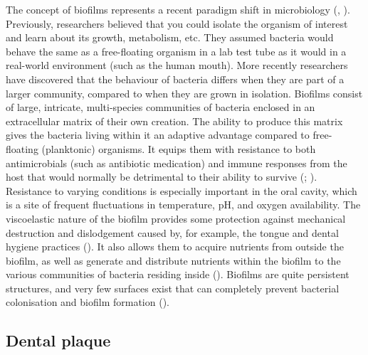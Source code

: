 \documentclass[
  b5paper,
]{book}
\begin{document}
The concept of biofilms represents a recent paradigm shift in
microbiology (, ).
Previously, researchers believed that you could isolate the organism of
interest and learn about its growth, metabolism, etc. They assumed
bacteria would behave the same as a free-floating organism in a lab test
tube as it would in a real-world environment (such as the human mouth).
More recently researchers have discovered that the behaviour of bacteria
differs when they are part of a larger community, compared to when they
are grown in isolation. Biofilms consist of large, intricate,
multi-species communities of bacteria enclosed in an extracellular
matrix of their own creation. The ability to produce this matrix gives
the bacteria living within it an adaptive advantage compared to
free-floating (planktonic) organisms. It equips them with resistance to
both antimicrobials (such as antibiotic medication) and immune responses
from the host that would normally be detrimental to their ability to
survive (;
). Resistance to varying conditions is especially important in the
oral cavity, which is a site of frequent fluctuations in temperature,
pH, and oxygen availability. The viscoelastic nature of the biofilm
provides some protection against mechanical destruction and dislodgement
caused by, for example, the tongue and dental hygiene practices
(). It also allows them to acquire nutrients from outside the
biofilm, as well as generate and distribute nutrients within the biofilm
to the various communities of bacteria residing inside
().
Biofilms are quite persistent structures, and very few surfaces exist
that can completely prevent bacterial colonisation and biofilm formation
().

\subsection{Dental plaque}\label{dental-plaque}
\end{document}
